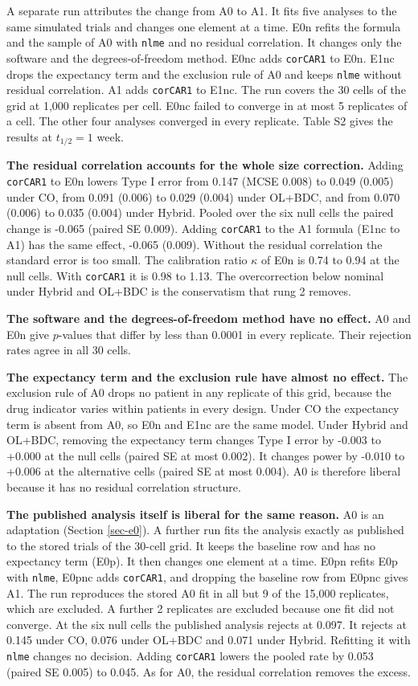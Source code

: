 \documentclass[
  11pt,
]{article}
\begin{document}
A separate run attributes the change from A0 to A1. It fits five
analyses to the same simulated trials and changes one
element at a time. E0n refits the formula and the sample of A0 with
\texttt{nlme} and no residual correlation. It changes only the software and
the degrees-of-freedom method. E0nc adds \texttt{corCAR1} to E0n. E1nc drops
the expectancy term and the exclusion rule of A0 and keeps \texttt{nlme}
without residual correlation. A1 adds \texttt{corCAR1} to E1nc. The run
covers the 30 cells of the grid at 1,000
replicates per cell. E0nc failed to converge in at most
5 replicates of a cell. The other four analyses
converged in every replicate. Table S2 gives the
results at \(t_{1/2} = 1\) week.

\textbf{The residual correlation accounts for the whole size correction.}
Adding \texttt{corCAR1} to E0n lowers Type I error from
0.147 (MCSE 0.008)
to 0.049
(0.005) under CO, from
0.091 (0.006)
to 0.029
(0.004) under OL+BDC, and from
0.070
(0.006) to
0.035
(0.004) under Hybrid. Pooled over
the six null cells the paired change is
-0.065 (paired SE
0.009). Adding \texttt{corCAR1} to the A1
formula (E1nc to A1) has the same effect,
-0.065
(0.009). Without the residual
correlation the standard error is too small. The calibration ratio
\(\kappa\) of E0n is 0.74 to
0.94 at the null cells. With
\texttt{corCAR1} it is 0.98 to
1.13. The overcorrection below
nominal under Hybrid and OL+BDC is the conservatism that rung 2
removes.

\textbf{The software and the degrees-of-freedom method have no effect.} A0 and
E0n give \(p\)-values that differ by less than
0.0001 in every
replicate. Their rejection
rates agree in all 30 cells.

\textbf{The expectancy term and the exclusion rule have almost no effect.}
The exclusion rule of A0 drops no patient in any replicate of this
grid, because the drug indicator varies within patients in every
design. Under CO the expectancy term is absent from A0, so E0n and E1nc are
the same model. Under Hybrid and OL+BDC, removing the expectancy term
changes Type I error by -0.003 to
+0.000 at the null cells (paired SE at most
0.002). It changes power by
-0.010 to +0.006 at the
alternative cells (paired SE at most 0.004).
A0 is therefore liberal because it has no residual correlation
structure.

\textbf{The published analysis itself is liberal for the same reason.} A0
is an adaptation (Section \ref{sec-e0}). A further run fits the
analysis exactly as published to the stored trials of the 30-cell
grid. It keeps the baseline row and has no expectancy term (E0p). It
then changes one element at a time. E0pn refits E0p with \texttt{nlme},
E0pnc adds \texttt{corCAR1}, and dropping the baseline row from E0pnc gives
A1. The run reproduces the stored A0 fit in all but 9 of
the 15,000 replicates, which are
excluded. A further 2 replicates are excluded because one
fit did not converge. At the six null cells the published analysis
rejects at 0.097. It rejects at 0.145 under
CO, 0.076 under OL+BDC and 0.071
under Hybrid. Refitting it with \texttt{nlme} changes no decision. Adding
\texttt{corCAR1} lowers the pooled rate by
0.053 (paired SE
0.005) to 0.045. As for
A0, the residual correlation removes the excess.
\end{document}
